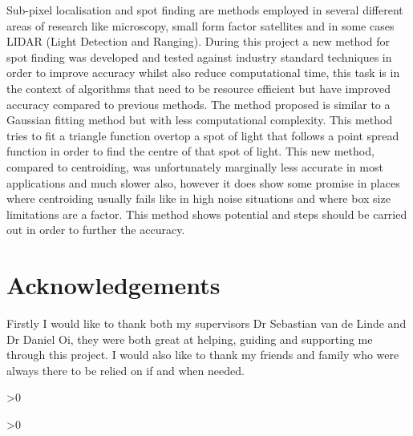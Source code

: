 \documentclass[aps,pra,a4paper,nofootinbib,onecolumn,tightenlines,longbibliography,12pt,amsfonts,amssymb,amsmath,floatfix]{revtex4-2} %
\begin{document}
Sub-pixel localisation and spot finding are methods employed in several different areas of research
like microscopy, small form factor satellites and in some cases LIDAR (Light Detection and Ranging). During this 
project a new method for spot finding was developed and tested against industry standard techniques in order 
to improve accuracy whilst also reduce computational time, this task is in the context of algorithms that need 
to be resource efficient but have improved accuracy compared to previous methods. The method proposed is similar to a Gaussian 
fitting method but with less computational complexity. This method tries to fit a triangle function overtop a spot 
of light that follows a point spread function in order to find the centre of that spot of light. This new method, 
compared to centroiding, was unfortunately marginally less accurate in most applications and much slower also, 
however it does show some promise in places where centroiding usually fails like in high noise situations and 
where box size limitations are a factor. This method shows potential and steps should be carried out 
in order to further the accuracy.

\newpage
\section*{Acknowledgements}

Firstly I would like to thank both my supervisors Dr Sebastian van de Linde and Dr Daniel Oi, 
they were both great at helping, guiding and supporting me through this project. I would also like 
to thank my friends and family who were always there to be relied on if and when needed. 

\newpage
\tableofcontents %
\makeatletter
\let\toc@pre\relax
\let\toc@post\relax
\makeatother

\ifnum\totalfigures>0
\newpage
\listoffigures
{}
\fi

\ifnum\totaltables>0
\newpage
\listoftables
{}
\fi







\newpage
{}
\end{document}
